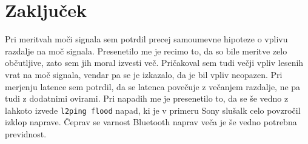 \documentclass[11pt,a4paper,slovene]{article}
\begin{document}
\section{Zaključek}

Pri meritvah moči signala sem potrdil precej samoumevne hipoteze o vplivu razdalje na moč signala. Presenetilo me je recimo to, da so bile meritve zelo občutljive, zato sem jih moral izvesti več. Pričakoval sem tudi večji vpliv lesenih vrat na moč signala, vendar pa se je izkazalo, da je bil vpliv neopazen. Pri merjenju latence sem potrdil, da se latenca povečuje z večanjem razdalje, ne pa tudi z dodatnimi ovirami. Pri napadih me je presenetilo to, da se še vedno z lahkoto izvede \texttt{l2ping flood} napad, ki je v primeru Sony slušalk celo povzročil izklop naprave. Čeprav se varnost Bluetooth naprav veča je še vedno potrebna previdnost.

\pagebreak


\end{document}
